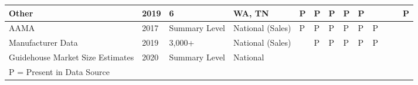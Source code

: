 \begin{table}
\begin{tabular}{|p{0.6in}|p{0.3in}|p{0.3in}|p{0.4in}|p{0.3in}|p{0.3in}|p{0.3in}|p{0.3in}|p{0.3in}|p{0.3in}|p{0.3in}|p{0.3in}|p{0.3in}|}
Other                            & 2019                 & 6               & WA,   TN                 & P           & P     & P            & P                    & P             &               &                &                & P        \\ \hline
AAMA                             & 2017                 & Summary   Level & National   (Sales)       & P           & P     & P            & P                    & P             & P             &                &                &          \\ \hline
Manufacturer Data                & 2019                 & 3,000+           & National   (Sales)       &             & P     & P            & P                    & P             & P             &                &                &          \\ \hline
Guidehouse Market Size Estimates & 2020                 & Summary   Level & National                 &             &       &              &                      &               &               &                &                &          \\ \hline
\multicolumn{13}{l}{P = Present in Data Source} \\
\end{tabular}
\end{table}